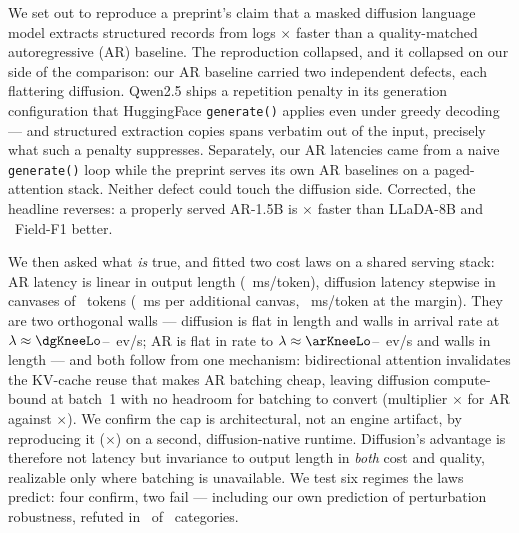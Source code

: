 
We set out to reproduce a preprint's claim that a masked diffusion language model
extracts structured records from logs \paperClaimedSpeedup$\times$ faster than a
quality-matched autoregressive (AR) baseline. The reproduction collapsed, and it
collapsed on our side of the comparison: our AR baseline carried two independent
defects, each flattering diffusion. Qwen2.5 ships a repetition penalty in its
generation configuration that HuggingFace \texttt{generate()} applies even under
greedy decoding --- and structured extraction copies spans verbatim out of the
input, precisely what such a penalty suppresses. Separately, our AR latencies
came from a naive \texttt{generate()} loop while the preprint serves its own AR
baselines on a paged-attention stack. Neither defect could touch the diffusion
side. Corrected, the headline reverses: a properly served AR-1.5B is
\arSpeedupOverMDM$\times$ faster than LLaDA-8B and \parityGap\ Field-F1 better.

We then asked what \emph{is} true, and fitted two cost laws on a shared serving
stack: AR latency is linear in output length (\arSlope~ms/token), diffusion
latency stepwise in canvases of \dgCanvas\ tokens (\dgStep~ms per additional
canvas, \dgMarginal~ms/token at the margin). They are two orthogonal walls ---
diffusion is flat in length and walls in arrival rate at
$\lambda \approx \dgKneeLo$--\dgKneeHi~ev/s; AR is flat in rate to
$\lambda \approx \arKneeLo$--\arKneeHi~ev/s and walls in length --- and both
follow from one mechanism: bidirectional attention invalidates the KV-cache
reuse that makes AR batching cheap, leaving diffusion compute-bound at batch~1
with no headroom for batching to convert (multiplier
\arMultOneTwoEight$\times$ for AR against \dgMultOneTwoEight$\times$). We
confirm the cap is architectural, not an engine artifact, by reproducing it
(\lladaMultDinfer$\times$) on a second, diffusion-native runtime. Diffusion's
advantage is therefore not latency but invariance to output length in
\emph{both} cost and quality, realizable only where batching is unavailable. We
test six regimes the laws predict: four confirm, two fail --- including our own
prediction of perturbation robustness, refuted in \perturbCategories\ of
\perturbCategories\ categories.
